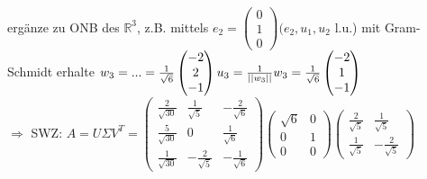 \documentclass[a4paper,11pt]{article}
\begin{document}
\begin{enumerate}[label=\alph*)]
	ergänze zu ONB des $\mathbb{R}^3$, z.B. mittels $e_2=\begin{pmatrix}0\\1\\0\end{pmatrix} (e_2,u_1,u_2$ l.u.) mit Gram-Schmidt erhalte $w_3=...=\frac{1}{\sqrt{6}}\begin{pmatrix}-2\\2\\-1\end{pmatrix} \\
	u_3=\frac{1}{\vert\vert w_3\vert\vert}w_3=\frac{1}{\sqrt{6}}\begin{pmatrix}-2\\1\\-1\end{pmatrix}$ \\
	$\Rightarrow$ SWZ: $A=U\Sigma V^T=\begin{pmatrix}\frac{2}{\sqrt{30}} & \frac{1}{\sqrt{5}} & -\frac{2}{\sqrt{6}} \\ \frac{5}{\sqrt{30}} & 0 & \frac{1}{\sqrt{6}} \\ \frac{1}{\sqrt{30}} & -\frac{2}{\sqrt{5}} & -\frac{1}{\sqrt{6}} \end{pmatrix}\begin{pmatrix}\sqrt{6}&0\\0&1\\0&0\end{pmatrix}\begin{pmatrix}\frac{2}{\sqrt{5}} & \frac{1}{\sqrt{5}} \\ \frac{1}{\sqrt{5}} & -\frac{2}{\sqrt{5}}\end{pmatrix}$
\end{enumerate}
\end{document}
